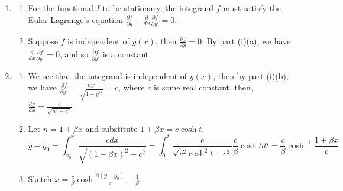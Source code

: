 \documentclass[a4paper]{article}
\begin{document}
\begin{ans}\leavevmode
\begin{enumerate}[label=(\roman*)]
\item 
\begin{enumerate}[label=(\alph*)]
\item For the functional $I$ to be stationary, the integrand $f$ must satisfy the Euler-Lagrange's equation $\frac{\partial f}{\partial y}-\frac{d}{dx}\frac{\partial f}{\partial y'}=0$.
\item Suppose $f$ is independent of $y(x)$, then $\frac{\partial f}{\partial y}=0$. By part (i)(a), we have $\frac{d}{dx}\frac{\partial f}{\partial y'}=0$, and so $\frac{\partial f}{\partial y'}$ is a constant.
\end{enumerate}
\item
\begin{enumerate}[label=(\alph*)]
\item We see that the integrand is independent of $y(x)$, then by part (i)(b), we have $\frac{\partial f}{\partial y'}=\frac{ny'}{\sqrt{1+y'^2}}=c$, where $c$ is some real constant. then, $\frac{dy}{dx}=\frac{c}{\sqrt{n^2-c^2}}$.
\item Let $n=1+\beta x$ and substitute $1+\beta x=c\cosh t$.
$$y-y_0=\int_{x_0}^x\frac{cdx}{\sqrt{(1+\beta x)^2-c^2}}=\int_0^t\frac{c}{\sqrt{c^2\cosh^2t-c^2}}\frac{c}{\beta}\cosh tdt=\frac{c}{\beta}\cosh^{-1}\frac{1+\beta x}{c}$$
\item Sketch $x=\frac{c}{\beta}\cosh\frac{\beta(y-y_0)}{c}-\frac{1}{\beta}$.
\end{enumerate}
\end{enumerate}
\begin{center}
\end{center}
\end{ans}
\end{document}
